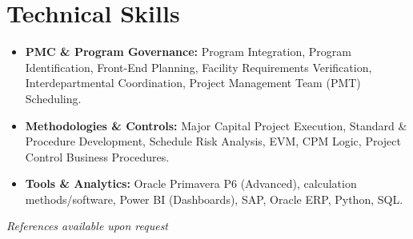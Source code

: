 \documentclass[11pt,a4paper]{article}
\begin{document}
\section{Technical Skills}
\begin{itemize}[label={\color{awesome-blue}\small\textbullet}, leftmargin=*, itemsep=0pt, parsep=0pt]
    \raggedright
    \item \textbf{PMC \& Program Governance:} Program Integration, Program Identification, Front-End Planning, Facility Requirements Verification, Interdepartmental Coordination, Project Management Team (PMT) Scheduling.
    \item \textbf{Methodologies \& Controls:} Major Capital Project Execution, Standard \& Procedure Development, Schedule Risk Analysis, EVM, CPM Logic, Project Control Business Procedures.
    \item \textbf{Tools \& Analytics:} Oracle Primavera P6 (Advanced), calculation methods/software, Power BI (Dashboards), SAP, Oracle ERP, Python, SQL.
\end{itemize}

\vfill
\begin{center}
    \textit{References available upon request}
\end{center}
\end{document}
